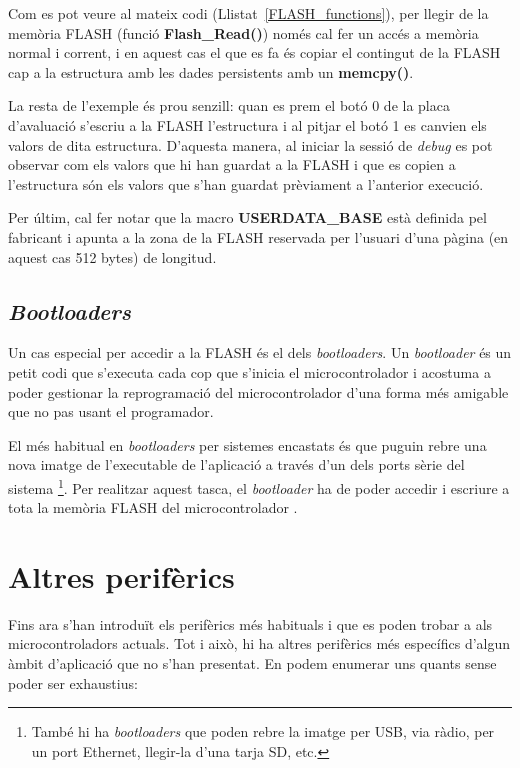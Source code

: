 Com es pot veure al mateix codi (Llistat~\ref{FLASH_functions}), per llegir de la memòria \gls{FLASH} (funció {\bf Flash\_Read()}) només cal fer un accés a memòria normal i corrent, i en aquest cas el que es fa és copiar el contingut de la FLASH cap a la estructura amb les dades persistents amb un {\bf memcpy()}.

La resta de l'exemple és prou senzill: quan es prem el botó 0 de la placa d'avaluació s'escriu a la FLASH l'estructura i al pitjar el botó 1 es canvien els valors de dita estructura. D'aquesta manera, al iniciar la sessió de {\em debug} es pot observar com els valors que hi han guardat a la FLASH i que es copien a l'estructura són els valors que s'han guardat prèviament a l'anterior execució.

Per últim, cal fer notar que la macro {\bf USERDATA\_BASE} està definida pel fabricant i apunta a la zona de la FLASH reservada per l'usuari d'una pàgina (en aquest cas 512 bytes) de longitud.

\section{\em Bootloaders}
\label{sec:Bootloader}
Un cas especial per accedir a la \gls{FLASH} és el dels {\em bootloaders}. Un {\em bootloader} és un petit codi que s'executa cada cop que s'inicia el microcontrolador i acostuma a poder gestionar la reprogramació del microcontrolador d'una forma més amigable que no pas usant el programador.

El més habitual en {\em bootloaders} per sistemes encastats és que puguin rebre una nova imatge de l'executable de l'aplicació a través d'un dels ports sèrie del sistema \footnote{També hi ha {\em bootloaders} que poden rebre la imatge per USB, via ràdio, per un port Ethernet, llegir-la d'una tarja SD, etc.}. Per realitzar aquest tasca, el {\em bootloader} ha de poder accedir i escriure a tota la memòria FLASH del microcontrolador \cite{AN0003}.

\chapter{Altres perifèrics}
\label{ch:otherperipherals}
Fins ara s'han introduït els perifèrics més habituals i que es poden trobar a als microcontroladors actuals. Tot i això, hi ha altres perifèrics més específics d'algun àmbit d'aplicació que no s'han presentat. En podem enumerar uns quants sense poder ser exhaustius:

